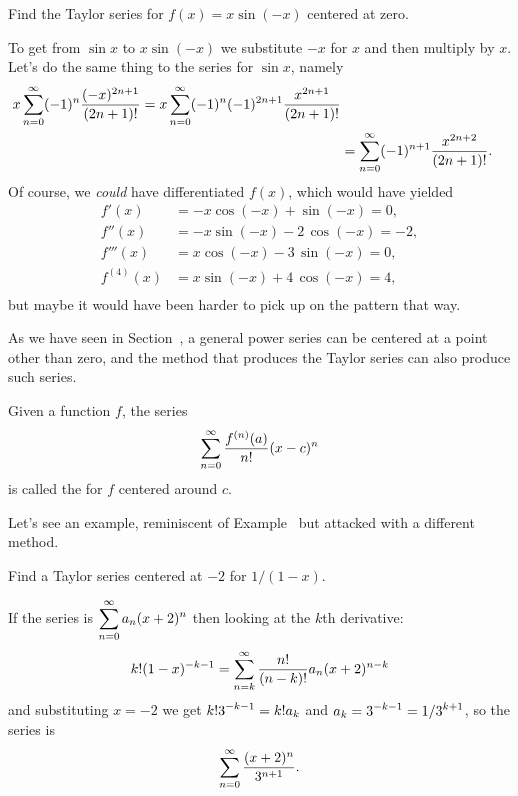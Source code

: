 \begin{example} Find the Taylor series for $f(x) = x\sin(-x)$ centered at zero.
\end{example}
\begin{solution}
To get from $\sin x$ to $x\sin(-x)$ we substitute $-x$ for $x$ and
then multiply by $x$.  Let's do the same thing to the series for $\sin
x$, namely
\begin{align*}
  x\sum_{n=0}^\infty (-1)^n{(-x)^{2n+1}\over (2n+1)!} =x\sum_{n=0}^\infty (-1)^{n}(-1)^{2n+1}{x^{2n+1}\over (2n+1)!} \\
  &=\sum_{n=0}^\infty (-1)^{n+1}{x^{2n+2}\over (2n+1)!}.
\end{align*}
Of course, we \textit{could} have differentiated $f(x)$, which would have yielded
\begin{align*}
f'(x) &= -x \cos\left(-x\right) + \sin\left(-x\right) = 0, \\
f''(x) &= -x \sin\left(-x\right) - 2 \, \cos\left(-x\right) = -2, \\
f'''(x) &= x \cos\left(-x\right) - 3 \, \sin\left(-x\right) = 0, \\
f^{(4)}(x) &= x \sin\left(-x\right) + 4 \, \cos\left(-x\right) = 4, \\
\end{align*}
but maybe it would have been harder to pick up on the pattern that way.
\end{solution}

As we have seen in
Section~, a general
power series can be centered at a point other than zero, and the
method that produces the Taylor series can also produce such series.
\begin{definition}\label{defn:taylor-series}
Given a function $f$, the series
$$\sum_{n=0}^\infty {f^{(n)}(a)\over n!}(x-c)^n$$
is called the  for $f$ centered around $c$.
\end{definition}

Let's see an example, reminiscent of
Example~ but
attacked with a different method.
\begin{example} Find a Taylor series centered at $-2$ for $1/(1-x)$.
\end{example}

\begin{solution}
If the series is $\displaystyle\sum_{n=0}^\infty a_n(x+2)^n$ then looking at the
$k$th derivative:
$$k!(1-x)^{-k-1}=\sum_{n=k}^\infty {n!\over (n-k)!}a_n(x+2)^{n-k}$$
and substituting $x=-2$ we get
$\displaystyle k!3^{-k-1}=k!a_k$ and $\displaystyle a_k=3^{-k-1}=1/3^{k+1}$, so the series is
$$\sum_{n=0}^\infty {(x+2)^n\over 3^{n+1}}.$$
\end{solution}

